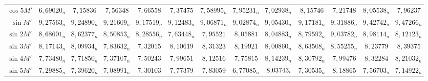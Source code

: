 \begin{landscape}
\begin{center}
\begin{tabular}{@{}r|*{11}{r|}r@{}}
\(\cos 5M'\) & \(6{,}69020_n\) & \(7{,}15836\) & \(7{,}56348\) & \(7{,}66558\) & \(7{,}37475\) & \(7{,}58995_n\) & \(7{,}95231_n\) & \(7{,}02938_n\) & \(8{,}15746\) & \(7{,}21748\) & \(8{,}05538_n\) & \(7{,}96237\)\\[.6em]
\(\sin M'\) & \(9{,}27563_n\) & \(9{,}24890_n\) & \(9{,}21609_n\) & \(9{,}17519_n\) & \(9{,}12483_n\) & \(9{,}06871_n\) & \(9{,}02874_n\) & \(9{,}05430_n\) & \(9{,}17181_n\) & \(9{,}31886_n\) & \(9{,}42742_n\) & \(9{,}47266_n\)\\
\(\sin 2M'\) & \(8{,}68601_n\) & \(8{,}62377_n\) & \(8{,}50853_n\) & \(8{,}28556_n\) & \(7{,}63448_n\) & \(7{,}95521\) & \(8{,}05881\) & \(8{,}04883_n\) & \(8{,}79592_n\) & \(9{,}03782_n\) & \(8{,}98114_n\) & \(8{,}12123_n\)\\
\(\sin 3M'\) & \(8{,}17143_n\) & \(8{,}09934_n\) & \(7{,}83632_n\) & \(7{,}32015\) & \(8{,}10619\) & \(8{,}31323\) & \(8{,}19921\) & \(8{,}00860_n\) & \(8{,}63508_n\) & \(8{,}55255_n\) & \(8{,}23779\) & \(8{,}39375\)\\
\(\sin 4M'\) & \(7{,}73480_n\) & \(7{,}71850_n\) & \(7{,}37107_n\) & \(7{,}50243\) & \(7{,}99651\) & \(8{,}12516\) & \(7{,}75815\) & \(8{,}14239_n\) & \(8{,}30792_n\) & \(7{,}99476\) & \(8{,}32284\) & \(8{,}21032_n\)\\
\(\sin 5M'\) & \(7{,}29885_n\) & \(7{,}39620_n\) & \(7{,}08991_n\) & \(7{,}30103\) & \(7{,}77379\) & \(7{,}83059\) & \(6{,}77085_n\) & \(8{,}03743_{\text{\rotatebox{90}{$\scriptstyle n$}}}\) & \(7{,}30535_n\) & \(8{,}18865\) & \(7{,}56703_u\) & \(7{,}14922_n\)\\
\end{tabular}
\end{center}
\endgroup
\end{landscape}

